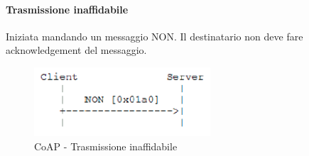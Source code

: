 \documentclass{article}
\begin{document}
\paragraph{Trasmissione inaffidabile}
Iniziata mandando un messaggio NON. Il destinatario non deve fare acknowledgement del messaggio.
\begin{figure}[H]
\centering
\includegraphics[scale=0.6]{figures/coap trasmissione inaffidabile.png}
\caption{CoAP - Trasmissione inaffidabile}
\end{figure}
\end{document}
